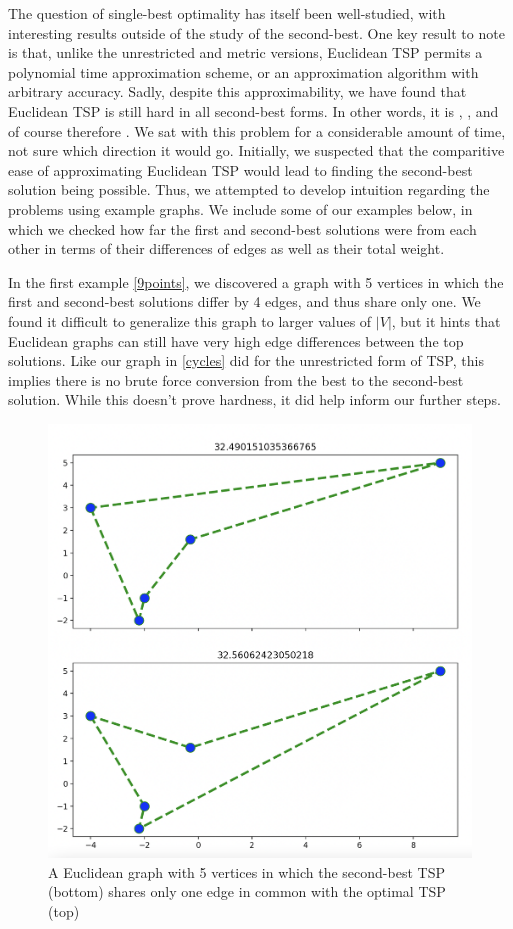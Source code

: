 The question of single-best optimality has itself been well-studied, with interesting results outside of the study of the second-best. One key result to note is that, unlike the unrestricted and metric versions, Euclidean TSP permits a polynomial time approximation scheme, or an approximation algorithm with arbitrary accuracy. Sadly, despite this approximability, we have found that Euclidean TSP is still hard in all second-best forms. In other words, it is \exobht{}, \inobht{}, and of course therefore \exbht{}. We sat with this problem for a considerable amount of time, not sure which direction it would go. Initially, we suspected that the comparitive ease of approximating Euclidean TSP would lead to finding the second-best solution being possible. Thus, we attempted to develop intuition regarding the problems using example graphs. We include some of our examples below, in which we checked how far the first and second-best solutions were from each other in terms of their differences of edges as well as their total weight.



In the first example \autoref{9points}, we discovered a graph with 5 vertices in which the first and second-best solutions differ by 4 edges, and thus share only one. We found it difficult to generalize this graph to larger values of $|V|$, but it hints that Euclidean graphs can still have very high edge differences between the top solutions. Like our graph in \autoref{cycles} did for the unrestricted form of TSP, this implies there is no brute force conversion from the best to the second-best solution. While this doesn't prove hardness, it did help inform our further steps.
\begin{figure}[!ht]
	\centering
	\includegraphics[width=\textwidth, height=.5\textheight, keepaspectratio]{images/5points.png}
	\caption{A Euclidean graph with 5 vertices in which the second-best TSP (bottom) shares only one edge in common with the optimal TSP (top)}\label{5points}
\end{figure}

